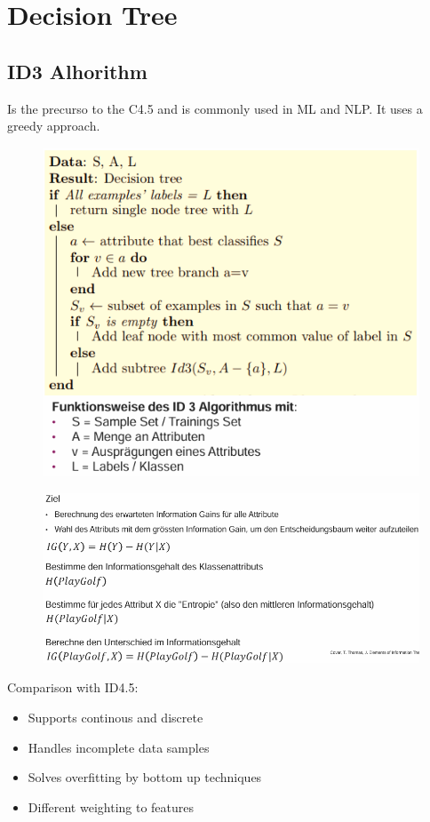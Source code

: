 \documentclass[../Main.tex]{subfiles}
\begin{document}
\section{Decision Tree}
\subsection{ID3 Alhorithm}
Is the precurso to the C4.5 and is commonly used in ML and NLP.
It uses a greedy approach.
\begin{figure}[H]
    \centering
    \includegraphics[width=0.75\linewidth]{Images/datan/id3-algorithm.png}
\end{figure}
\begin{figure}[H]
    \centering
    \includegraphics[width=0.75\linewidth]{Images/datan/tree-attribute-calc.png}
\end{figure}
Comparison with ID4.5:
\begin{itemize}
    \item Supports continous and discrete
    \item Handles incomplete data samples
    \item Solves overfitting by bottom up techniques
    \item Different weighting to features
\end{itemize}
\end{document}
